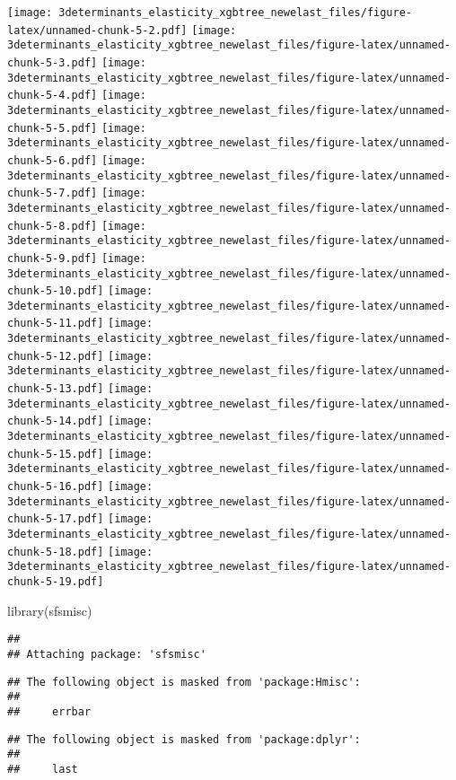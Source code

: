 \documentclass[
]{article}
\newenvironment{Shaded}{\begin{snugshade}}{\end{snugshade}}
\newcommand{\FunctionTok}[1]{\textcolor[rgb]{0.00,0.00,0.00}{#1}}
\newcommand{\NormalTok}[1]{#1}
\begin{document}
\texttt{[image: 3determinants\_elasticity\_xgbtree\_newelast\_files/figure-latex/unnamed-chunk-5-2.pdf]}
\texttt{[image: 3determinants\_elasticity\_xgbtree\_newelast\_files/figure-latex/unnamed-chunk-5-3.pdf]}
\texttt{[image: 3determinants\_elasticity\_xgbtree\_newelast\_files/figure-latex/unnamed-chunk-5-4.pdf]}
\texttt{[image: 3determinants\_elasticity\_xgbtree\_newelast\_files/figure-latex/unnamed-chunk-5-5.pdf]}
\texttt{[image: 3determinants\_elasticity\_xgbtree\_newelast\_files/figure-latex/unnamed-chunk-5-6.pdf]}
\texttt{[image: 3determinants\_elasticity\_xgbtree\_newelast\_files/figure-latex/unnamed-chunk-5-7.pdf]}
\texttt{[image: 3determinants\_elasticity\_xgbtree\_newelast\_files/figure-latex/unnamed-chunk-5-8.pdf]}
\texttt{[image: 3determinants\_elasticity\_xgbtree\_newelast\_files/figure-latex/unnamed-chunk-5-9.pdf]}
\texttt{[image: 3determinants\_elasticity\_xgbtree\_newelast\_files/figure-latex/unnamed-chunk-5-10.pdf]}
\texttt{[image: 3determinants\_elasticity\_xgbtree\_newelast\_files/figure-latex/unnamed-chunk-5-11.pdf]}
\texttt{[image: 3determinants\_elasticity\_xgbtree\_newelast\_files/figure-latex/unnamed-chunk-5-12.pdf]}
\texttt{[image: 3determinants\_elasticity\_xgbtree\_newelast\_files/figure-latex/unnamed-chunk-5-13.pdf]}
\texttt{[image: 3determinants\_elasticity\_xgbtree\_newelast\_files/figure-latex/unnamed-chunk-5-14.pdf]}
\texttt{[image: 3determinants\_elasticity\_xgbtree\_newelast\_files/figure-latex/unnamed-chunk-5-15.pdf]}
\texttt{[image: 3determinants\_elasticity\_xgbtree\_newelast\_files/figure-latex/unnamed-chunk-5-16.pdf]}
\texttt{[image: 3determinants\_elasticity\_xgbtree\_newelast\_files/figure-latex/unnamed-chunk-5-17.pdf]}
\texttt{[image: 3determinants\_elasticity\_xgbtree\_newelast\_files/figure-latex/unnamed-chunk-5-18.pdf]}
\texttt{[image: 3determinants\_elasticity\_xgbtree\_newelast\_files/figure-latex/unnamed-chunk-5-19.pdf]}

\begin{Shaded}
\begin{Highlighting}[]
\FunctionTok{library}\NormalTok{(sfsmisc)}
\end{Highlighting}
\end{Shaded}

\begin{verbatim}
## 
## Attaching package: 'sfsmisc'
\end{verbatim}

\begin{verbatim}
## The following object is masked from 'package:Hmisc':
## 
##     errbar
\end{verbatim}

\begin{verbatim}
## The following object is masked from 'package:dplyr':
## 
##     last
\end{verbatim}
\end{document}
